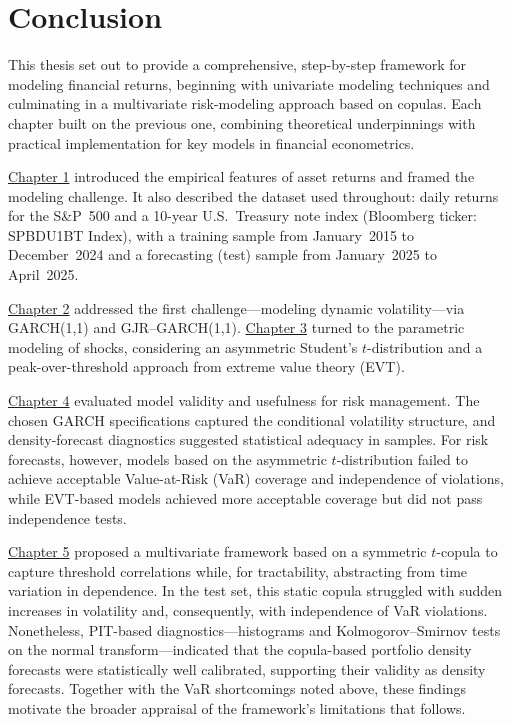 \chapter*{Conclusion}

This thesis set out to provide a comprehensive, step-by-step framework for modeling financial returns, beginning with univariate modeling techniques and culminating in a multivariate risk-modeling approach based on copulas. Each chapter built on the previous one, combining theoretical underpinnings with practical implementation for key models in financial econometrics.

\hyperref[chap:1]{Chapter 1} introduced the empirical features of asset returns and framed the modeling challenge. It also described the dataset used throughout: daily returns for the S\&P~500 and a 10-year U.S.\ Treasury note index (Bloomberg ticker: SPBDU1BT Index), with a training sample from January~2015 to December~2024 and a forecasting (test) sample from January~2025 to April~2025.

\hyperref[chap:2]{Chapter 2} addressed the first challenge—modeling dynamic volatility—via GARCH(1,1) and GJR–GARCH(1,1). \hyperref[chap:3]{Chapter 3} turned to the parametric modeling of shocks, considering an asymmetric Student’s $t$-distribution and a peak-over-threshold approach from extreme value theory (EVT).

\hyperref[chap:4]{Chapter 4} evaluated model validity and usefulness for risk management. The chosen GARCH specifications captured the conditional volatility structure, and density-forecast diagnostics suggested statistical adequacy in samples. For risk forecasts, however, models based on the asymmetric $t$-distribution failed to achieve acceptable Value-at-Risk (VaR) coverage and independence of violations, while EVT-based models achieved more acceptable coverage but did not pass independence tests.

\hyperref[chap:5]{Chapter 5} proposed a multivariate framework based on a symmetric $t$-copula to capture threshold correlations while, for tractability, abstracting from time variation in dependence. In the test set, this static copula struggled with sudden increases in volatility and, consequently, with independence of VaR violations. Nonetheless, PIT-based diagnostics—histograms and Kolmogorov–Smirnov tests on the normal transform—indicated that the copula-based portfolio density forecasts were statistically well calibrated, supporting their validity as density forecasts. Together with the VaR shortcomings noted above, these findings motivate the broader appraisal of the framework's limitations that follows.

